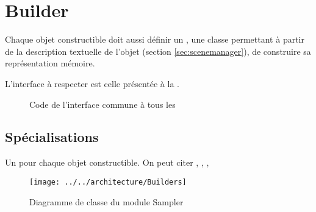 \section{Builder}
Chaque objet constructible doit aussi définir un , \ie une classe
permettant à partir de la description textuelle de l'objet (\cf section
\ref{sec:scenemanager}), de construire sa représentation mémoire.

L'interface à respecter est celle présentée à la .

\begin{figure}[h]
  \caption{Code de l'interface commune à tous les
  \label{fig:IBuilders}}
\end{figure}


\subsection{Spécialisations}
Un pour chaque objet constructible. On peut citer ,
, , \etc

\begin{figure}[h]
\begin{center}
  \vspace*{-4cm}
  \texttt{[image: ../../architecture/Builders]}
  \caption{Diagramme de classe du module Sampler\label{fig:CDBuilders}}
\end{center}
\end{figure}
